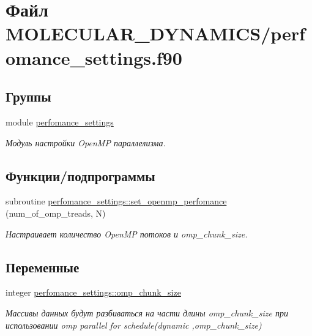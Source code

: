 \hypertarget{perfomance__settings_8f90}{}\section{Файл M\+O\+L\+E\+C\+U\+L\+A\+R\+\_\+\+D\+Y\+N\+A\+M\+I\+C\+S/perfomance\+\_\+settings.f90}
\label{perfomance__settings_8f90}
\subsection*{Группы}
\begin{DoxyCompactItemize}
\item 
module \mbox{\hyperlink{namespaceperfomance__settings}{perfomance\+\_\+settings}}
\begin{DoxyCompactList}\small\item\em Модуль настройки Open\+MP параллелизма. \end{DoxyCompactList}\end{DoxyCompactItemize}
\subsection*{Функции/подпрограммы}
\begin{DoxyCompactItemize}
\item 
subroutine \mbox{\hyperlink{namespaceperfomance__settings_a50a101c3721ccc0da3b5867807ea6c70}{perfomance\+\_\+settings\+::set\+\_\+openmp\+\_\+perfomance}} (num\+\_\+of\+\_\+omp\+\_\+treads, N)
\begin{DoxyCompactList}\small\item\em Настраивает количество Open\+MP потоков и omp\+\_\+chunk\+\_\+size. \end{DoxyCompactList}\end{DoxyCompactItemize}
\subsection*{Переменные}
\begin{DoxyCompactItemize}
\item 
integer \mbox{\hyperlink{namespaceperfomance__settings_a1632739c07471b87731fe9e33f69fcae}{perfomance\+\_\+settings\+::omp\+\_\+chunk\+\_\+size}}
\begin{DoxyCompactList}\small\item\em Массивы данных будут разбиваться на части длины omp\+\_\+chunk\+\_\+size при использовании omp parallel for schedule(dynamic ,omp\+\_\+chunk\+\_\+size) \end{DoxyCompactList}\end{DoxyCompactItemize}
